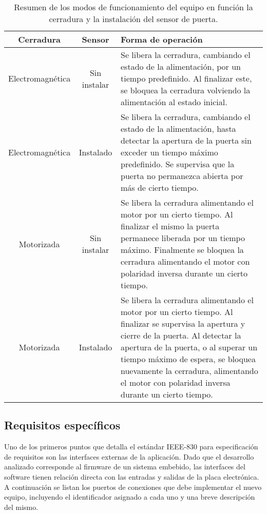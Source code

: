 \begin{table}[ht]
	\centering
	\caption[Resumen de los modos de funcionamiento del equipo]{Resumen de los modos de funcionamiento del equipo en función la cerradura y la instalación del sensor de puerta.}
	\begin{tabular}{c c L{80mm}}
		\toprule
		\textbf{Cerradura} 	& 
		\textbf{Sensor}	&
		\textbf{Forma de operación} \\
		\midrule
		Electromagnética &
		Sin instalar &
		Se libera la cerradura, cambiando el estado de la alimentación, por un tiempo predefinido. Al finalizar este, se bloquea la cerradura volviendo la alimentación al estado inicial.\\
		\midrule
		Electromagnética &
		Instalado &
		Se libera la cerradura, cambiando el estado de la alimentación, hasta detectar la apertura de la puerta sin exceder un tiempo máximo predefinido. Se supervisa que la puerta no permanezca abierta por más de cierto tiempo.\\
		\midrule
		Motorizada &
		Sin instalar &
		Se libera la cerradura alimentando el motor por un cierto tiempo. Al finalizar el mismo la puerta permanece liberada por un tiempo máximo. Finalmente se bloquea la cerradura alimentando el motor con polaridad inversa durante un cierto tiempo.\\
		\midrule
		Motorizada &
		Instalado &
		Se libera la cerradura alimentando el motor por un cierto tiempo. Al finalizar se supervisa la apertura y cierre de la puerta. Al detectar la apertura de la puerta, o al superar un tiempo máximo de espera, se bloquea nuevamente la cerradura, alimentando el motor con polaridad inversa durante un cierto tiempo.\\
		\bottomrule
		\hline
	\end{tabular}
	\label{tab:ModosOperacion}
\end{table}

\subsection{Requisitos específicos}
\label{sub:Requisitos}

Uno de los primeros puntos que detalla el estándar IEEE-830\cite{institute_of_electrical_and_electronics_engineers_830-1998_nodate}\cite{menendez_especificacion_nodate} para especificación de requisitos son las interfaces externas de la aplicación. Dado que el desarrollo analizado corresponde al firmware de un sistema embebido, las interfaces del software tienen relación directa con las entradas y salidas de la placa electrónica. A continuación se listan los puertos de conexiones que debe implementar el nuevo equipo, incluyendo el identificador asignado a cada uno y una breve descripción del mismo.


